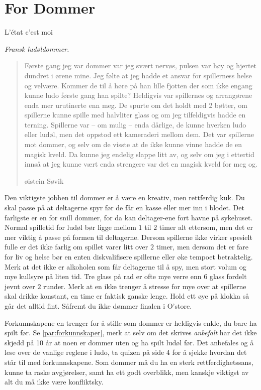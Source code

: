 \documentclass[10pt,a4paper,norsk,openany]{book}
\begin{document}
\chapter{For Dommer}

\epigraph{L'état c'est moi}{\textit{Fransk ludøldommer.}}

\blockquote[øistein Søvik]{%
  Første gang jeg var dommer var jeg svært nervøs, pulsen var høy og hjertet
  dundret i ørene mine. Jeg følte at jeg hadde et ansvar for spillerness helse
  og velvære. Kommer de til å høre på han lille fjotten der som ikke engang
  kunne ludo første gang han spilte? Heldigvis var spillernes og arrangørene
  enda mer urutinerte enn meg. De spurte om det holdt med 2 bøtter, om
  spillerne kunne spille med halvliter glass og om jeg tilfeldigvis hadde en
  terning. Spillerne var -- om mulig -- enda dårlige, de kunne hverken ludo
  eller ludøl, men det oppstod ett kameraderi mellom dem. Det var spillerne mot
  dommer, og selv om de visste at de ikke kunne vinne hadde de en magisk kveld.
  Da kunne jeg endelig slappe litt av, og selv om jeg i ettertid innså at jeg
  kunne vært enda strengere var det en magisk kveld for meg og. }


Den viktigste jobben til dommer er å være en kreativ, men rettferdig kuk. Du
skal passe på at deltagerne spyr før de får en kasse eller mer inn i blodet.
Det farligste er en for snill dommer, for da kan deltager-ene fort havne på
sykehuset. Normal spilletid for ludøl bør ligge mellom $1$ til $2$ timer alt
ettersom, men det er mer viktig å passe på formen til deltagerne. Dersom
spillerne ikke virker spesielt fulle er det ikke farlig om spillet varer litt
over $2$ timer, men dersom det er fare for liv og helse bør en enten
diskvalifisere spillerne eller øke tempoet betraktelig. Merk at det ikke er
alkoholen som får deltagerne til å spy, men stort volum og mye kullsyre på
liten tid. Tre glass på rad er ofte mye verre enn 6 glass fordelt jevnt over $2$
runder. Merk at en ikke trenger å stresse for mye over at spillerne skal drikke
konstant, en time er faktisk ganske lenge. Hold ett øye på klokka så går det
alltid fint. Såfremt du ikke dømmer finalen i O'store. 

Forkunnskapene en trenger for å stille som dommer er heldigvis enkle, du bare ha
spilt før. Se \cref{par:forkunnskaper}, merk at selv om det skrives
\emph{anbefalt} har det ikke skjedd på 10 år at noen er dommer uten og ha spilt
ludøl før. Det anbefales og å lese over de vanlige reglene i ludo, ta quizen på
side 4 for å sjekke hvordan det står til med forkunnskapene. Som dommer må du ha
en sterk rettferdighetssans, kunne ta raske avgjørelser, samt ha ett godt
overblikk, men kanskje viktigst av alt du må ikke være konfliktsky.
\end{document}
